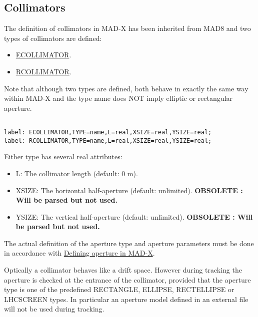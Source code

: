 





\subsection{Collimators}
 The definition of collimators in MAD-X has been inherited from MAD8 and two types of collimators are defined: 
\begin{itemize}
	\item \href{ecol}{ECOLLIMATOR}. 
	\item \href{rcol}{RCOLLIMATOR}. 
\end{itemize}  Note that although two types are defined, both behave in exactly the same way within MAD-X and the type name does NOT imply elliptic or rectangular aperture.   
\begin{verbatim}

label: ECOLLIMATOR,TYPE=name,L=real,XSIZE=real,YSIZE=real;
label: RCOLLIMATOR,TYPE=name,L=real,XSIZE=real,YSIZE=real;
\end{verbatim}  Either type has several real attributes: 
\begin{itemize}
	\item L: The collimator length (default: 0 m). 
	\item XSIZE: The horizontal half-aperture (default: unlimited). \textbf{OBSOLETE : Will be parsed but not used.}
	\item YSIZE: The vertical half-aperture (default: unlimited). \textbf{OBSOLETE : Will be parsed but not used.}
\end{itemize}  The actual definition of the aperture type and aperture parameters must be done in accordance with \href{aperture.html}{Defining aperture in MAD-X}.  

 Optically a collimator behaves like a drift space.  However during tracking the aperture is checked at the entrance of the collimator, provided that the aperture type is one of the predefined RECTANGLE, ELLIPSE, RECTELLIPSE or LHCSCREEN types.  In particular an aperture model defined in an external file will not be used during tracking. 

